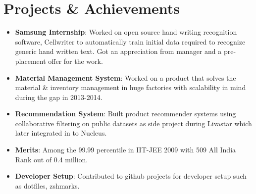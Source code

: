 \documentclass[letterpaper,11pt]{article}
\newcommand{\resumeItem}[2]{
  \item\small{
    \textbf{#1}{: #2 \vspace{-2pt}}
  }
}
\newcommand{\resumeSubItem}[2]{\resumeItem{#1}{#2}\vspace{-4pt}}
\newcommand{\resumeSubHeadingListStart}{\begin{itemize}[leftmargin=*]}
\newcommand{\resumeSubHeadingListEnd}{\end{itemize}}
\begin{document}
\section{Projects \& Achievements}
  \resumeSubHeadingListStart
    \resumeSubItem{Samsung Internship}
      {Worked on open source hand writing recognition software, Cellwriter to automatically train initial data required to recognize generic hand written text. Got an appreciation from manager and a pre-placement offer for the work.}
    \resumeSubItem{Material Management System}
      {Worked on a product that solves the material \& inventory management in huge factories with scalability in mind during the gap in 2013-2014.}
    \resumeSubItem{Recommendation System}
      {Built product recommender systems using collaborative filtering on public datasets as side project during Livastar which later integrated in to Nucleus.}
    \resumeSubItem{Merits}
      {Among the 99.99 percentile in IIT-JEE 2009 with 509 All India Rank out of 0.4 million.}
    \resumeSubItem{Developer Setup}
      {Contributed to github projects for developer setup such as dotfiles, zshmarks.}
  \resumeSubHeadingListEnd

%


\end{document}
